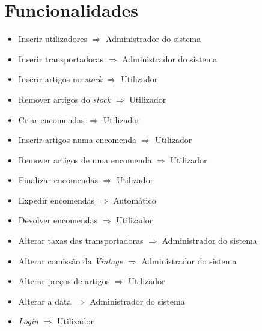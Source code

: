 \chapter{Funcionalidades}

    \begin{itemize}
        
        \item Inserir utilizadores $\Rightarrow$ Administrador do sistema
        
        \item Inserir transportadoras $\Rightarrow$ Administrador do sistema
        
        \item Inserir artigos no \textit{stock} $\Rightarrow$ Utilizador
        
        \item Remover artigos do \textit{stock} $\Rightarrow$ Utilizador
        
        \item Criar encomendas $\Rightarrow$ Utilizador
        
        \item Inserir artigos numa encomenda $\Rightarrow$ Utilizador
        
        \item Remover artigos de uma encomenda $\Rightarrow$ Utilizador
        
        \item Finalizar encomendas $\Rightarrow$ Utilizador
        
        \item Expedir encomendas $\Rightarrow$ Automático
        
        \item Devolver encomendas $\Rightarrow$ Utilizador
        
        \item Alterar taxas das transportadoras $\Rightarrow$ Administrador do sistema
        
        \item Alterar comissão da \textit{Vintage} $\Rightarrow$ Administrador do sistema
        
        \item Alterar preços de artigos $\Rightarrow$ Utilizador
        
        \item Alterar a data $\Rightarrow$ Administrador do sistema
        
        \item \textit{Login} $\Rightarrow$ Utilizador
        

\end{itemize}

